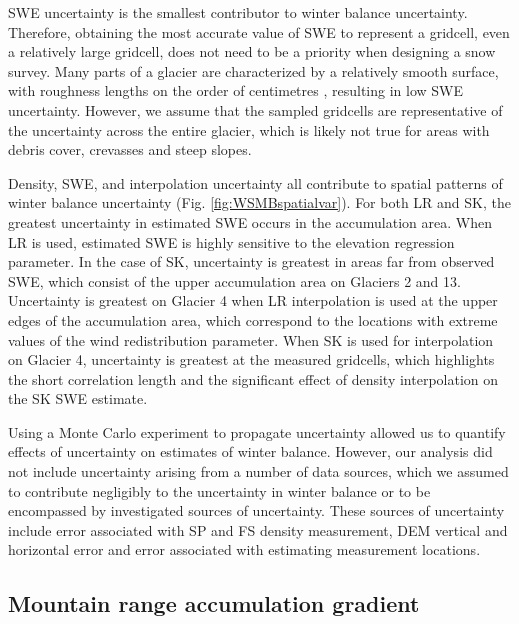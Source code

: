 \documentclass[twocolumn, letterpaper]{igs}
\begin{document}
SWE uncertainty is the smallest contributor to winter balance uncertainty. Therefore, obtaining the most accurate value of SWE to represent a gridcell, even a relatively large gridcell, does not need to be a priority when designing a snow survey. Many parts of a glacier are characterized by a relatively smooth surface, with roughness lengths on the order of centimetres \citep[e.g.][]{Hock2005}, resulting in low SWE uncertainty. However, we assume that the sampled gridcells are representative of the uncertainty across the entire glacier, which is likely not true for areas with debris cover, crevasses and steep slopes.

Density, SWE, and interpolation uncertainty all contribute to spatial patterns of winter balance uncertainty (Fig. \ref{fig:WSMBspatialvar}). For both LR and SK, the greatest uncertainty in estimated SWE occurs in the accumulation area. When LR is used, estimated SWE is highly sensitive to the elevation regression parameter. In the case of SK, uncertainty is greatest in areas far from observed SWE, which consist of the upper accumulation area on Glaciers 2 and 13. Uncertainty is greatest on Glacier 4 when LR interpolation is used at the upper edges of the accumulation area, which correspond to the locations with extreme values of the wind redistribution parameter. When SK is used for interpolation on Glacier 4, uncertainty is greatest at the measured gridcells, which highlights the short correlation length and the significant effect of density interpolation on the SK SWE estimate.

Using a Monte Carlo experiment to propagate uncertainty allowed us to quantify effects of uncertainty on estimates of winter balance. However, our analysis did not include uncertainty arising from a number of data sources, which we assumed to contribute negligibly to the uncertainty in winter balance or to be encompassed by investigated sources of uncertainty. These sources of uncertainty include error associated with SP and FS density measurement, DEM vertical and horizontal error and error associated with estimating measurement locations.


\subsection{Mountain range accumulation gradient}
\end{document}
